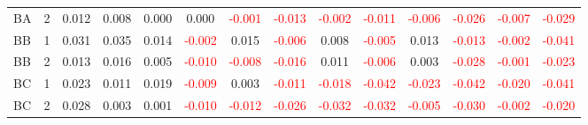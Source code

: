 \begin{table}[H]
{\begin{tabular}{llcccccccccccc}
BA & 2 & 0.012 & 0.008 & 0.000 & 0.000 & \textcolor{red}{-0.001} & \textcolor{red}{-0.013} & \textcolor{red}{-0.002} & \textcolor{red}{-0.011} & \textcolor{red}{-0.006} & \textcolor{red}{-0.026} & \textcolor{red}{-0.007} & \textcolor{red}{-0.029}\\
BB & 1 & 0.031 & 0.035 & 0.014 & \textcolor{red}{-0.002} & 0.015 & \textcolor{red}{-0.006} & 0.008 & \textcolor{red}{-0.005} & 0.013 & \textcolor{red}{-0.013} & \textcolor{red}{-0.002} & \textcolor{red}{-0.041}\\
BB & 2 & 0.013 & 0.016 & 0.005 & \textcolor{red}{-0.010} & \textcolor{red}{-0.008} & \textcolor{red}{-0.016} & 0.011 & \textcolor{red}{-0.006} & 0.003 & \textcolor{red}{-0.028} & \textcolor{red}{-0.001} & \textcolor{red}{-0.023}\\
BC & 1 & 0.023 & 0.011 & 0.019 & \textcolor{red}{-0.009} & 0.003 & \textcolor{red}{-0.011} & \textcolor{red}{-0.018} & \textcolor{red}{-0.042} & \textcolor{red}{-0.023} & \textcolor{red}{-0.042} & \textcolor{red}{-0.020} & \textcolor{red}{-0.041}\\
BC & 2 & 0.028 & 0.003 & 0.001 & \textcolor{red}{-0.010} & \textcolor{red}{-0.012} & \textcolor{red}{-0.026} & \textcolor{red}{-0.032} & \textcolor{red}{-0.032} & \textcolor{red}{-0.005} & \textcolor{red}{-0.030} & \textcolor{red}{-0.002} & \textcolor{red}{-0.020}\\
\hline
    \end{tabular}%
    }
    \label{tab:cen5_cov}
\end{table}

